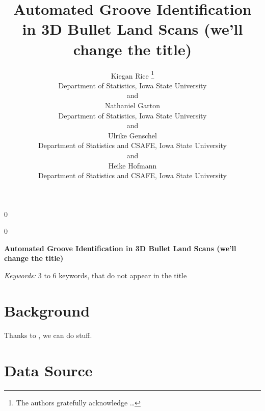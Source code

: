 \documentclass[12pt]{article}
\newcommand{\blind}{0}
\begin{document}
\def\spacingset#1{\renewcommand{\baselinestretch}%
{#1}\small\normalsize} \spacingset{1}




\blind
{
  \title{\bf Automated Groove Identification in 3D Bullet Land Scans (we'll change
the title)}

  \author{
        Kiegan Rice \thanks{The authors gratefully acknowledge \ldots{}} \\
    Department of Statistics, Iowa State University\\
     and \\     Nathaniel Garton \\
    Department of Statistics, Iowa State University\\
     and \\     Ulrike Genschel \\
    Department of Statistics and CSAFE, Iowa State University\\
     and \\     Heike Hofmann \\
    Department of Statistics and CSAFE, Iowa State University\\
      }
  \maketitle
} \fi

\blind
{
  \bigskip
  \bigskip
  \bigskip
  \begin{center}
    {\LARGE\bf Automated Groove Identification in 3D Bullet Land Scans (we'll change
the title)}
  \end{center}
  \medskip
} \fi

\bigskip
\begin{abstract}

\end{abstract}

\noindent%
{\it Keywords:} 3 to 6 keywords, that do not appear in the title
\vfill

\newpage
\spacingset{1.45} %

\section{Background}

Thanks to \cite{Hamby}, we can do stuff. \citet{Hamby}

\section{Data Source}
\end{document}
